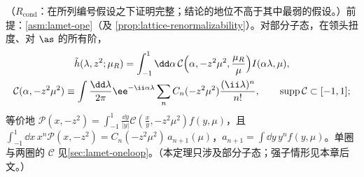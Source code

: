 \begin{theorem}\label{thm:lamet-coordinate}
（$R_{\mathrm{cond}}$：在所列编号假设之下证明完整；结论的地位不高于其中最弱的假设。）前提：\cref{asm:lamet-ope}（及 \cref{prop:lattice-renormalizability}）。对部分子态，在领头扭度、对 $\as$ 的所有阶，
\begin{equation}\label{eq:lamet-coord-fact}
\begin{gathered}
\tilde h(\lambda,z^2;\mu_R)=\int_{-1}^1\dd\alpha\,\mathcal C\Big(\alpha,-z^2\mu^2,\frac{\mu_R}\mu\Big)I(\alpha\lambda,\mu),\\
\mathcal C(\alpha,-z^2\mu^2)\equiv\int\frac{\dd\lambda}{2\pi}\ee^{-\ii\alpha\lambda}\sum_nC_n(-z^2\mu^2)\frac{(\ii\lambda)^n}{n!},\qquad{\rm supp}\,\mathcal C\subset[-1,1];
\end{gathered}
\end{equation}%
等价地 $\mathcal P(x,-z^2)=\int_{-1}^1\frac{\dd y}{|y|}\mathcal C(\frac xy,-z^2\mu^2)f(y,\mu)$，且 $\int_{-1}^1\dd x\,x^n\mathcal P(x,-z^2)=C_n(-z^2\mu^2)\,a_{n+1}(\mu)$，$a_{n+1}=\int\dd y\,y^nf(y,\mu)$。单圈与两圈的 $\mathcal C$ 见\cref{sec:lamet-oneloop}。（本定理只涉及部分子态；强子情形见本章后文。）
\end{theorem}

